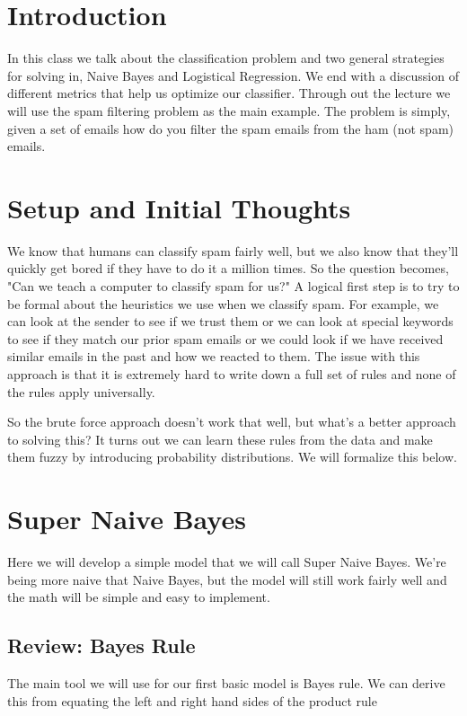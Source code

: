 
\section{Introduction}
In this class we talk about the classification problem and two general strategies for solving in, Naive Bayes and Logistical Regression. We end with a discussion of different metrics that help us optimize our classifier. Through out the lecture we will use the spam filtering problem as the main example. The problem is simply, given a set of emails how do you filter the spam emails from the ham (not spam) emails.

\section{Setup and Initial Thoughts}
We know that humans can classify spam fairly well, but we also know that they'll quickly get bored if they have to do it a million times. So the question becomes, "Can we teach a computer to classify spam for us?" A logical first step is to try to be formal about the heuristics we use when we classify spam. For example, we can look at the sender to see if we trust them or we can look at special keywords to see if they match our prior spam emails or we could look if we have received similar emails in the past and how we reacted to them. The issue with this approach is that it is extremely hard to write down a full set of rules and none of the rules apply universally. 

So the brute force approach doesn't work that well, but what's a better approach to solving this? It turns out we can learn these rules from the data and make them fuzzy by introducing probability distributions. We will formalize this below.

\section{Super Naive Bayes}
Here we will develop a simple model that we will call Super Naive Bayes. We're being more naive that Naive Bayes, but the model will still work fairly well and the math will be simple and easy to implement. 

\subsection{Review: Bayes Rule}
The main tool we will use for our first basic model is Bayes rule. We can derive this from equating the left and right hand sides of the product rule 

